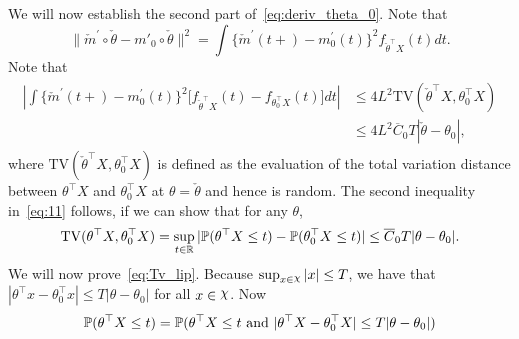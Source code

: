 { We will now establish the second part of~\eqref{eq:deriv_theta_0}. Note that 
\begin{equation}\label{eq:part_2_3.6}
\|\check{m}^\prime \circ \check\theta- m'_0\circ\check\theta\|^2 
= \int\{\check{m}^\prime(t + ) - m_0^\prime(t )\}^2 f_{\check\theta^\top X }(t) dt.
\end{equation}
Note that 
\begin{align}\label{eq:11}
\begin{split}
\left|\int\{\check{m}^\prime(t + ) - m_0^\prime(t )\}^2 \big[f_{\check\theta^\top X }(t)-f_{\theta_0^\top X }(t)\big] dt\right| &\le 4L^2 \mathrm{TV}(\check\theta^\top X, \theta_0^\top X)\\ 
&\le 4L^2\overline{C}_0T |\check\theta- \theta_0|,
\end{split}
\end{align}
where $\mathrm{TV}(\check\theta^{\top}X, \theta_0^{\top}X)$ is defined as the evaluation of the total variation distance between $\theta^{\top}X$ and $\theta_0^{\top}X$ at $\theta = \check\theta$ and hence is random. The second inequality in~\eqref{eq:11} follows, if we can show that for any $\theta$,
\begin{align}\label{eq:Tv_lip}
\mathrm{TV}(\theta^\top X, \theta_0^\top X) = \sup_{t\in \mathbb{R}} |\mathbb{P}(\theta^\top X\le t)- \mathbb{P}( \theta_0^\top X\le t)| \le \overline{C}_0T |{\theta}-\theta_0|.
\end{align}
We will now prove~\eqref{eq:Tv_lip}. Because $\sup_{x\in \rchi} |x| \le T$, we have that $|\theta^\top x- \theta_0^\top x| \le  T|\theta-\theta_0|$ for all $x\in \rchi$. Now 
\begin{align}\label{eq:Tv_lip_proof}
\begin{split}
\p(\theta^\top X\le t ) &= \p(\theta^\top X\le t \text{ and } |\theta^\top X- \theta_0^\top X| \le  T|{\theta}-\theta_0|)\\

\end{split}
\end{align}}
